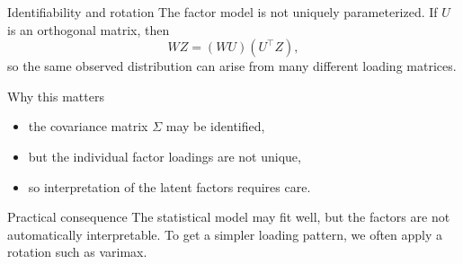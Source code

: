 \documentclass[dvipsnames,aspectratio=169,handout]{beamer}
\begin{document}
\begin{frame}{Identifiability and rotation}
The factor model is not uniquely parameterized.
If $U$ is an orthogonal matrix, then
\[
WZ = (WU)(U^\top Z),
\]
so the same observed distribution can arise from many different loading matrices.

\begin{block}{Why this matters}
\begin{itemize}
    \item the covariance matrix $\Sigma$ may be identified,
    \item but the individual factor loadings are not unique,
    \item so interpretation of the latent factors requires care.
\end{itemize}
\end{block}

\begin{alertblock}{Practical consequence}
The statistical model may fit well, but the factors are not automatically interpretable.
To get a simpler loading pattern, we often apply a rotation such as varimax.
\end{alertblock}
\end{frame}
\end{document}
